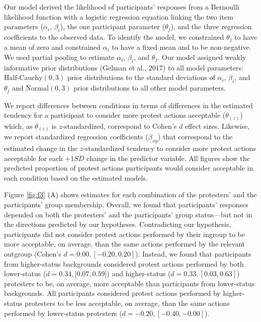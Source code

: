 \documentclass[12pt, letterpaper]{article}
\begin{document}
Our model derived the likelihood of participants' responses from a
Bernoulli likelihood function with a logistic regression equation
linking the two item parameters (\(\alpha_i\), \(\beta_i\)), the one
participant parameter (\(\theta_j\)), and the three regression
coefficients to the observed data. To identify the model, we constrained
\(\theta_j\) to have a mean of zero and constrained \(\alpha_i\) to have
a fixed mean and to be non-negative. We used partial pooling to estimate
\(\alpha_i\), \(\beta_i\), and \(\theta_j\). Our model assigned weakly
informative prior distributions (Gelman et al., 2017) to all model
parameters: \(\text{Half-Cauchy} (0, 3)\) prior distributions to the
standard deviations of \(\alpha_i\), \(\beta_i\), and \(\theta_j\) and
\(\text{Normal} (0, 3)\) prior distributions to all other model
parameters.

We report differences between conditions in terms of differences in the
estimated tendency for a participant to consider more protest actions
acceptable (\(\theta_{(z)}\)) which, as \(\theta_{(z)}\) is
\(z\)-standardized, correspond to Cohen's \(d\) effect sizes. Likewise,
we report standardized regression coefficients (\(\beta_{xy}\)) that
correspond to the estimated change in the \(z\)-standardized tendency to
consider more protest actions acceptable for each \(+1\textit{SD}\)
change in the predictor variable. All figures show the predicted
proportion of protest actions participants would consider acceptable in
each condition based on the estimated models.

Figure \ref{fig:f3} (A) shows estimates for each combination of the
protesters' and the participants' group membership. Overall, we found
that participants' responses depended on both the protesters' and the
participants' group status---but not in the directions predicted by our
hypotheses. Contradicting our hypothesis, participants did not consider
protest actions performed by their ingroup to be more acceptable, on
average, than the same actions performed by the relevant outgroup
(Cohen's \(d = 0.00, [-0.20, 0.20]\)). Instead, we found that
participants from higher-status backgrounds considered protest actions
performed by both lower-status (\(d = 0.34, [0.07, 0.59\){]}) and
higher-status (\(d = 0.33, [0.03, 0.63]\)) protesters to be, on average,
more acceptable than participants from lower-status backgrounds. All
participants considered protest actions performed by higher-status
protesters to be less acceptable, on average, than the same actions
performed by lower-status protesters (\(d = -0.20, [-0.40, -0.00]\)).
\end{document}

